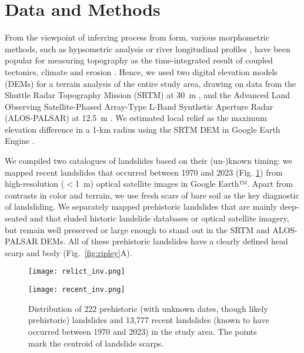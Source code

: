 \documentclass[draft]{agujournal2019}
\begin{document}

\section{Data and Methods}
\par From the viewpoint of inferring process from form, various morphometric methods, such as hypsometric analysis \cite{Strahler1952} or river longitudinal profiles \cite{Wobus2006}, have been popular for measuring topography as the time-integrated result of coupled tectonics, climate and erosion \cite{Whittaker2012, Perron2013, Willett2014}. Hence, we used two digital elevation models (DEMs) for a terrain analysis of the entire study area, drawing on data from the Shuttle Radar Topography Mission (SRTM) at 30~m \cite{farr2007}, and the Advanced Land Observing Satellite-Phased Array-Type L-Band Synthetic Aperture Radar (ALOS-PALSAR) at 12.5~m \cite{logan2014}. We estimated local relief as the maximum elevation difference in a 1-km radius using the SRTM DEM in Google Earth Engine \cite{moore2011}. 

\par We compiled two catalogues of landslides based on their (un-)known timing: we mapped recent landslides that occurred between 1970 and 2023 (Fig. \ref{fig:inventory}) from high-resolution ($<$1~m) optical satellite images in Google Earth™. Apart from contrasts in color and terrain, we use fresh scars of bare soil as the key diagnostic of landsliding. We separately mapped prehistoric landslides that are mainly deep-seated and that eluded historic landslide databases or optical satellite imagery, but remain well preserved or large enough to stand out in the SRTM and ALOS-PALSAR DEMs. All of these prehistoric landslides have a clearly defined head scarp and body (Fig.~\ref{fig:ripley}A).

\begin{figure}[ht!]
  \begin{minipage}{.48\linewidth}
    \centering
    {\texttt{[image: relict\_inv.png]}}
   \end{minipage}\quad
   \begin{minipage}{.48\linewidth}
    \centering
      {\texttt{[image: recent\_inv.png]}}
  \end{minipage}
    \caption{Distribution of 222 prehistoric (with unknown dates, though likely prehistoric) landslides and 13,777 recent landslides (known to have occurred between 1970 and 2023) in the study area. The points mark the centroid of landslide scarps.}
    \label{fig:inventory}
\end{figure}
\end{document}
